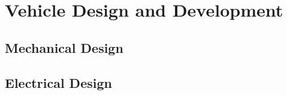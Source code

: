 \section{Vehicle Design and Development}
  \subsection{Mechanical Design}
  \subsection{Electrical Design}